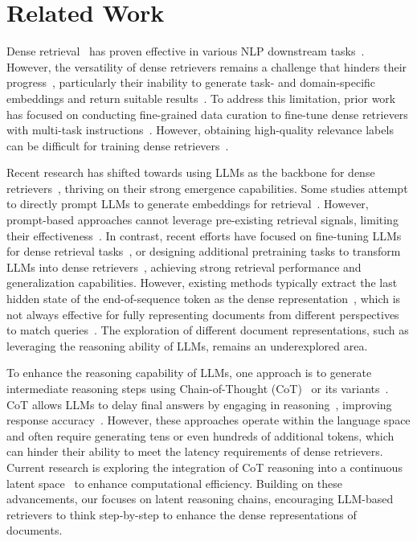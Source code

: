 \section{Related Work}
Dense retrieval~\cite{karpukhin2020dense, xiong2020approximate, su2022one} has proven effective in various NLP downstream tasks~\cite{liu2019fine, chen2024ms, guu2020retrieval}. However, the versatility of dense retrievers remains a challenge that hinders their progress~\cite{luo2024large, lee2024gecko}, particularly their inability to generate task- and domain-specific embeddings and return suitable results~\cite{su2022one, luo2024large, tao2024llms}. To address this limitation, prior work has focused on conducting fine-grained data curation to fine-tune dense retrievers with multi-task instructions~\cite{su2022one, asai2022task}. However, obtaining high-quality relevance labels can be difficult for training dense retrievers~\cite{yu2022coco, gao2022precise, wang2023improving}.

Recent research has shifted towards using LLMs as the backbone for dense retrievers~\cite{tao2024llms}, thriving on their strong emergence capabilities. Some studies attempt to directly prompt LLMs to generate embeddings for retrieval~\cite{zhuang2024promptreps}. However, prompt-based approaches cannot leverage pre-existing retrieval signals, limiting their effectiveness~\cite{zhu2023large}. In contrast, recent efforts have focused on fine-tuning LLMs for dense retrieval tasks~\cite{wang2023improving, ma2024fine, li2024llama2vec}, or designing additional pretraining tasks to transform LLMs into dense retrievers~\cite{behnamghader2024llm2vec}, achieving strong retrieval performance and generalization capabilities. However, existing methods typically extract the last hidden state of the end-of-sequence token as the dense representation~\cite{ma2024fine, luo2024large}, which is not always effective for fully representing documents from different perspectives to match queries~\cite{zhang2022multi, khattab2020colbert}. The exploration of different document representations, such as leveraging the reasoning ability of LLMs, remains an underexplored area.



To enhance the reasoning capability of LLMs, one approach is to generate intermediate reasoning steps using Chain-of-Thought (CoT)~\cite{wei2022chain} or its variants~\cite{chen2022program, zhang2024wrong}. CoT allows LLMs to delay final answers by engaging in reasoning~\cite{kudo2024think}, improving response accuracy~\cite{wei2022chain, chu2023survey}. However, these approaches operate within the language space and often require generating tens or even hundreds of additional tokens, which can hinder their ability to meet the latency requirements of dense retrievers. Current research is exploring the integration of CoT reasoning into a continuous latent space~\cite{hao2024training, xie2024self} to enhance computational efficiency. Building on these advancements, our \method{} focuses on latent reasoning chains, encouraging LLM-based retrievers to think step-by-step to enhance the dense representations of documents.